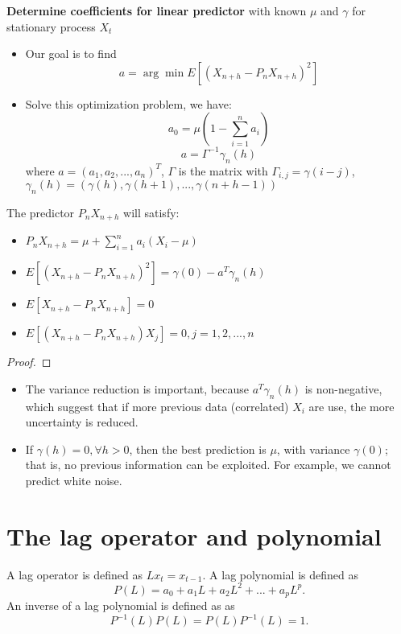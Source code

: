 \begin{mdframed}
	\textbf{Determine coefficients for linear predictor} with known $\mu$ and $\gamma$ for stationary process $X_t$ \cite[62]{brockwell2002introduction}\\
	\begin{itemize}
		\item Our goal is to find
		$$a = \arg\min E[(X_{n+h} - P_nX_{n+h})^2]$$
		\item Solve this optimization problem, we have: 
		$$a_0 = \mu(1 - \sum_{i=1}^n a_i)$$
		$$ a = \Gamma^{-1} \gamma_n(h)$$
		where $a=(a_1,a_2,...,a_n)^T$, $\Gamma$ is the matrix with $\Gamma_{i,j} = \gamma(i-j)$, $\gamma_n(h) = (\gamma(h), \gamma(h+1),...,\gamma(n+h-1))$
	\end{itemize}
\end{mdframed}

\begin{lemma}
	The predictor $P_nX_{n+h}$ will satisfy:
	\begin{itemize}
		\item $P_nX_{n+h} = \mu + \sum_{i=1}^n a_i(X_i - \mu)$
		\item $E[(X_{n+h}-P_nX_{n+h})^2] = \gamma(0)-a^T\gamma_n(h)$
		\item $E[X_{n+h} - P_nX_{n+h}] = 0$
		\item $E[(X_{n+h} - P_nX_{n+h})X_j] = 0, j=1,2,...,n$
	\end{itemize}
\end{lemma}
\begin{proof}

\end{proof}


\begin{remark}[interpretation]\hfill
	\begin{itemize}
		\item The variance reduction is important, because $a^T\gamma_n(h)$ is non-negative, which suggest that if more previous data (correlated) $X_i$ are use, the more uncertainty is reduced. 
		\item If $\gamma(h) = 0,\forall h>0$, then the best prediction is $\mu$, with variance $\gamma(0)$; that is, no previous information can be exploited. For example, we cannot predict white noise.
	\end{itemize}
\end{remark}

\section{The lag operator and polynomial}
\begin{definition}
A lag operator is defined as $Lx_t = x_{t-1}$. A lag polynomial is defined as
$$P(L) = a_0 + a_1L + a_2L^2 + ... + a_pL^p.$$
An inverse of a lag polynomial is defined as as$$P^{-1}(L)P(L)=P(L)P^{-1}(L)=1.$$
\end{definition}

